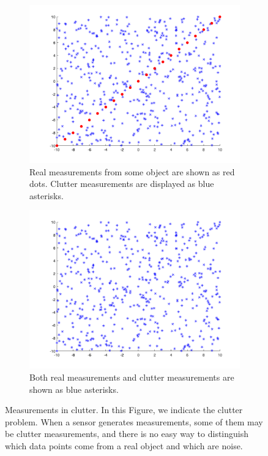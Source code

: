 \begin{figure}
\centering
\begin{subfigure}[t]{.45\textwidth}
  \centering
  \includegraphics[width=.9\linewidth]{figures/clutter.intro.1.png}
   \caption{Real measurements from some object are shown as red dots. Clutter measurements are displayed as blue asterisks.}
  \label{fig:clutter-intro:1}
\end{subfigure}\hfill
\begin{subfigure}[t]{.45\textwidth}
  \centering
  \includegraphics[width=.9\linewidth]{figures/clutter.intro.2.png}
  \caption{Both real measurements and clutter measurements are shown as blue asterisks.}
  \label{fig:clutter-intro:2}
\end{subfigure}
\caption{Measurements in clutter. In this Figure, we indicate the clutter problem. When a sensor generates measurements, some of them may be clutter measurements, and there is no easy way to distinguish which data points come from a real object and which are noise.}
\label{fig:clutter-intro}
\end{figure}

